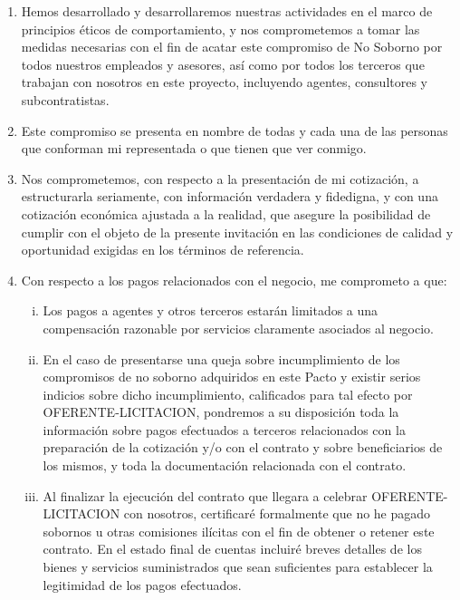 \documentclass[11pt,a4paper]{letter} %
\begin{document}
\begin{letter}
\begin{enumerate}
\item Hemos desarrollado y desarrollaremos nuestras actividades en el marco de
principios éticos de comportamiento, y nos comprometemos a tomar las medidas
necesarias con el fin de acatar este compromiso de No Soborno por todos nuestros
empleados y asesores, así como por todos los terceros que trabajan con nosotros
en este proyecto, incluyendo agentes, consultores y subcontratistas.

\item Este compromiso se presenta en nombre de todas y cada una de las personas
que conforman mi representada o que tienen que ver conmigo.

\item Nos comprometemos, con respecto a la presentación de mi cotización, a
estructurarla seriamente, con información verdadera y fidedigna, y con una
cotización económica ajustada a la realidad, que asegure la posibilidad de cumplir
con el objeto de la presente invitación en las condiciones de calidad y oportunidad
exigidas en los términos de referencia.

\item Con respecto a los pagos relacionados con el negocio, me comprometo a que:
\begin{enumerate}[i.]
\item Los pagos a agentes y otros terceros estarán limitados a una
compensación razonable por servicios claramente asociados al negocio.

\item En el caso de presentarse una queja sobre incumplimiento de los
compromisos de no soborno adquiridos en este Pacto y existir serios
indicios sobre dicho incumplimiento, calificados para tal efecto por OFERENTE-LICITACION, pondremos a su disposición toda la información sobre pagos efectuados a terceros relacionados con la preparación de la cotización y/o con el contrato y sobre beneficiarios de los mismos, y toda la documentación relacionada con el contrato.

\item Al finalizar la ejecución del contrato que llegara a celebrar OFERENTE-LICITACION con nosotros, certificaré formalmente que no he pagado sobornos u otras comisiones ilícitas con el fin de obtener o retener este contrato. En el estado final de cuentas incluiré breves detalles de los bienes y servicios suministrados que sean suficientes para establecer la legitimidad de los pagos efectuados.
\end{enumerate}


\end{enumerate}
\end{letter}
\end{document}
